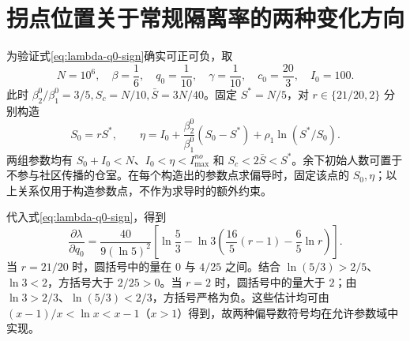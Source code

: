 \section{拐点位置关于常规隔离率的两种变化方向}
\label{app:lambda}
为验证式\eqref{eq:lambda-q0-sign}确实可正可负，取
\[
N=10^6,\quad \beta=\frac16,\quad q_0=\frac1{10},\quad
\gamma=\frac1{10},\quad c_0=\frac{20}{3},\quad I_0=100.
\]
此时 $\beta_2^0/\beta_1^0=3/5,S_c=N/10,\bar S=3N/40$。固定 $S^*=N/5$，对 $r\in\{21/20,2\}$ 分别构造
\[
S_0=rS^*,\qquad
\eta=I_0+\frac{\beta_2^0}{\beta_1^0}(S_0-S^*)+\rho_1\ln(S^*/S_0).
\]
两组参数均有 $S_0+I_0<N$、$I_0<\eta<I_{\max}^{no}$ 和 $S_c<2\bar S<S^*$。余下初始人数可置于不参与社区传播的仓室。在每个构造出的参数点求偏导时，固定该点的 $S_0,\eta$；以上关系仅用于构造参数点，不作为求导时的额外约束。

代入式\eqref{eq:lambda-q0-sign}，得到
\begin{equation}
\frac{\partial\lambda}{\partial q_0}
=\frac{40}{9(\ln5)^2}
\left[\ln\frac53-\ln3\left(\frac{16}{5}(r-1)-\frac65\ln r\right)\right].
\end{equation}
当 $r=21/20$ 时，圆括号中的量在 $0$ 与 $4/25$ 之间。结合 $\ln(5/3)>2/5$、$\ln3<2$，方括号大于 $2/25>0$。当 $r=2$ 时，圆括号中的量大于 $2$；由 $\ln3>2/3$、$\ln(5/3)<2/3$，方括号严格为负。这些估计均可由 $(x-1)/x<\ln x<x-1$（$x>1$）得到，故两种偏导数符号均在允许参数域中实现。

